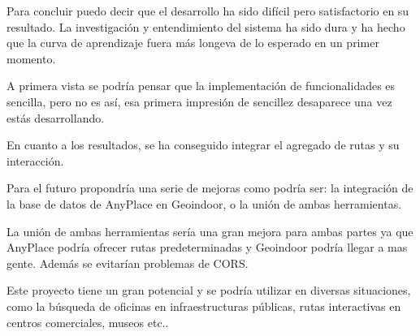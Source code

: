 
Para concluir puedo decir que el desarrollo ha sido difícil pero satisfactorio en su resultado. La investigación y entendimiento del sistema ha sido dura y ha hecho que la curva de aprendizaje fuera más longeva de lo esperado en un primer momento.

A primera vista se podría pensar que la implementación de funcionalidades es sencilla, pero no es así, esa primera impresión de sencillez desaparece una vez estás desarrollando. 

En cuanto a los resultados, se ha conseguido integrar el agregado de rutas y su interacción.

Para el futuro propondría una serie de mejoras como podría ser: la integración de la base de datos de AnyPlace en Geoindoor, o la unión de ambas herramientas. 

La unión de ambas herramientas sería una gran mejora para ambas partes ya que AnyPlace podría ofrecer rutas predeterminadas y Geoindoor podría llegar a mas gente. Además se evitarían problemas de CORS.

Este proyecto tiene un gran potencial y se podría utilizar en diversas situaciones, como la búsqueda de oficinas en infraestructuras públicas, rutas interactivas en centros comerciales, museos etc..  

